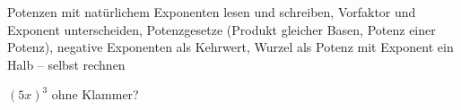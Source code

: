 \begin{aufgabe}{Potenzen mit natürlichem Exponenten lesen und schreiben, Vorfaktor und Exponent unterscheiden, Potenzgesetze (Produkt gleicher Basen, Potenz einer Potenz), negative Exponenten als Kehrwert, Wurzel als Potenz mit Exponent ein Halb – selbst rechnen}
\begin{teile}
\teil $(5x)^3$ ohne Klammer? \leerfeld
\end{teile}
\end{aufgabe}

